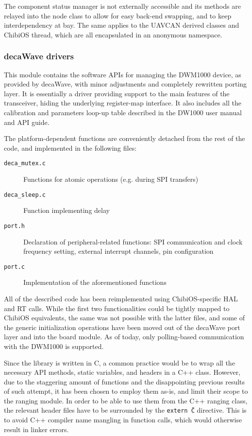 The component status manager is not externally accessible and its methods are relayed into the node class to allow for easy back-end swapping, and to keep interdependency at bay.
The same applies to the UAVCAN derived classes and ChibiOS thread, which are all encapsulated in an anonymous namespace.


\subsubsection{decaWave drivers}
This module contains the software APIs for managing the DWM1000 device, as provided by decaWave, with minor adjustments and completely rewritten porting layer.
It is essentially a driver providing support to the main features of the transceiver, hiding the underlying register-map interface.
It also includes all the calibration and parameters loop-up table described in the DW1000 user manual and API guide.

The platform-dependent functions are conveniently detached from the rest of the code, and implemented in the following files:
\begin{description}
    \item[\texttt{deca\_mutex.c}] Functions for atomic operations (e.g. during SPI transfers)
    \item[\texttt{deca\_sleep.c}] Function implementing delay
    \item[\texttt{port.h}] Declaration of peripheral-related functions: SPI communication and clock frequency setting, external interrupt channels, pin configuration
    \item[\texttt{port.c}] Implementation of the aforementioned functions
\end{description}

All of the described code has been reimplemented using ChibiOS-specific HAL and RT calls.
While the first two functionalities could be tightly mapped to ChibiOS equivalents, the same was not possible with the latter files, and  some of the generic initialization operations have been moved out of the decaWave port layer and into the board module.
As of today, only polling-based communication with the DWM1000 is supported.

Since the library is written in C, a common practice would be to wrap all the necessary API methods, static variables, and headers in a C++ class.
However, due to the staggering amount of functions and the disappointing previous results of such attempt, it has been chosen to employ them as-is, and limit their scope to the ranging module.
In order to be able to use them from the C++ ranging class, the relevant header files have to be surrounded by the \texttt{extern \"C\"} directive.
This is to avoid C++ compiler name mangling in function calls, which would otherwise result in linker errors.


